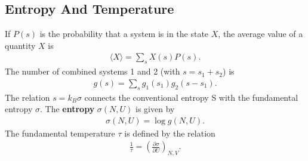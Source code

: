 \begin{multicols}{2}
	\section{Entropy And Temperature}
	If $P(s)$ is the probability that a system is in the state $X$, the average value of a quantity $X$ is 
	\begin{align}
		\langle X \rangle = \sum_{s}X(s)P(s).
	\end{align}
	The number of combined systems 1 and 2 (with $s=s_1+s_2$) is
	\begin{align}
		g(s) = \sum_s g_1(s_1)g_2(s-s_1).
	\end{align}
	The relation $s=k_B\sigma$ connects the conventional entropy S with the fundamental entropy $\sigma$. The \textbf{entropy} $\sigma(N,U)$ is given by 
	\begin{align}
		\sigma(N,U) = \log g(N,U).
	\end{align}
	The fundamental temperature $\tau$ is defined by the relation
	\begin{align}
		\frac{1}{\tau} = \left(\frac{\partial \sigma}{\partial U}\right)_{N,V}.
	\end{align}

\end{multicols}
